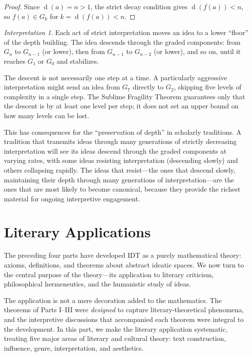 \documentclass[11pt,openany]{book}
\theoremstyle{definition}
\theoremstyle{plain}
\theoremstyle{remark}
\newtheorem{interpretation}[axiom]{Interpretation}
\newcommand{\depth}{\operatorname{d}}       %
\begin{document}
\begin{proof}
Since $\depth(a) = n > 1$, the strict decay condition gives $\depth(f(a)) < n$, so $f(a) \in G_k$ for $k = \depth(f(a)) < n$.
\end{proof}

\begin{interpretation}
Each act of strict interpretation moves an idea to a lower ``floor'' of the depth building. The idea descends through the graded components: from $G_n$ to $G_{n-1}$ (or lower), then from $G_{n-1}$ to $G_{n-2}$ (or lower), and so on, until it reaches $G_1$ or $G_0$ and stabilizes.

The descent is not necessarily one step at a time. A particularly aggressive interpretation might send an idea from $G_7$ directly to $G_2$, skipping five levels of complexity in a single step. The Sublime Fragility Theorem guarantees only that the descent is by at least one level per step; it does not set an upper bound on how many levels can be lost.

This has consequences for the ``preservation of depth'' in scholarly traditions. A tradition that transmits ideas through many generations of strictly decreasing interpretation will see its ideas descend through the graded components at varying rates, with some ideas resisting interpretation (descending slowly) and others collapsing rapidly. The ideas that resist---the ones that descend slowly, maintaining their depth through many generations of interpretation---are the ones that are most likely to become canonical, because they provide the richest material for ongoing interpretive engagement.
\end{interpretation}


\part{Literary Applications}

The preceding four parts have developed IDT as a purely mathematical theory: axioms, definitions, and theorems about abstract ideatic spaces. We now turn to the central purpose of the theory---its application to literary criticism, philosophical hermeneutics, and the humanistic study of ideas.

The application is not a mere decoration added to the mathematics. The theorems of Parts I--III were \emph{designed} to capture literary-theoretical phenomena, and the interpretive discussions that accompanied each theorem were integral to the development. In this part, we make the literary application systematic, treating five major areas of literary and cultural theory: text construction, influence, genre, interpretation, and aesthetics.
\end{document}
